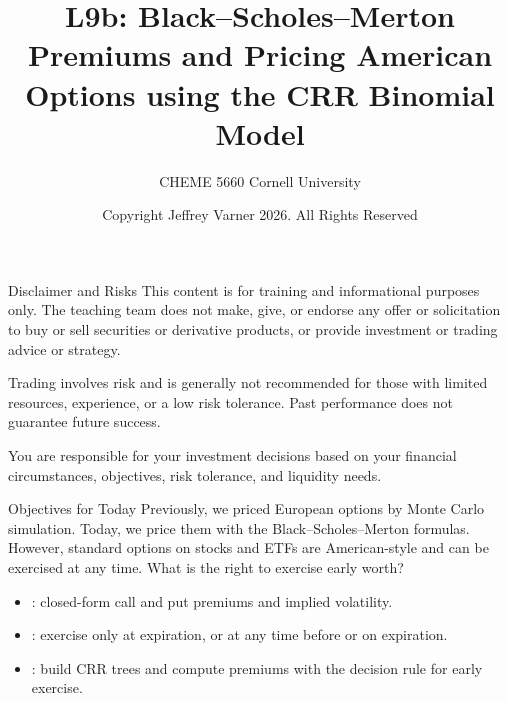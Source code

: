 \documentclass[aspectratio=169,11pt]{beamer}
\title{\texorpdfstring{{\vnheavy L9b}}{L9b}: Black–Scholes–Merton Premiums and Pricing American Options using the CRR Binomial Model}
\subtitle{CHEME 5660 Cornell University}
\author{Copyright Jeffrey Varner 2026. All Rights Reserved}
\begin{document}
\vntitlepage

\begin{frame}{Disclaimer and Risks}
  \vspace{0.6em}
  \textbf{} This content is for training and informational
  purposes only. The teaching team does not make, give, or endorse any offer or
  solicitation to buy or sell securities or derivative products, or provide
  investment or trading advice or strategy.

  \vspace{1.1em}
  \textbf{} Trading involves risk and is generally not recommended for
  those with limited resources, experience, or a low risk tolerance. Past
  performance does not guarantee future success.

  \vspace{1.1em}
  \textbf{} You are responsible for your investment decisions
  based on your financial circumstances, objectives, risk tolerance, and
  liquidity needs.
\end{frame}

\begin{frame}{Objectives for Today}
  Previously, we priced European options by Monte Carlo simulation. Today, we
  price them with the Black--Scholes--Merton formulas. However, standard options on
  stocks and ETFs are American-style and can be exercised at any time. What is the
  right to exercise early worth?

  \vspace{0.5em}
  {\large\textbf{}}
  \begin{itemize}\setlength{\itemsep}{0.4em}
    \item {}:
      closed-form call and put premiums and implied volatility.
    \item {}: exercise
      only at expiration, or at any time before or on expiration.
    \item {}: build
      CRR trees and compute premiums with the decision rule for early exercise.
  \end{itemize}
\end{frame}
\end{document}
